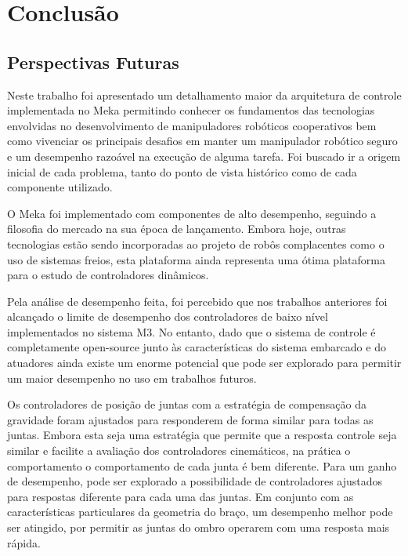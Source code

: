 \chapter{Conclusão} \label{ch:conclusoes}

\section{Perspectivas Futuras}

Neste trabalho foi apresentado um detalhamento maior da arquitetura de controle implementada no Meka permitindo conhecer os fundamentos das tecnologias envolvidas no desenvolvimento de manipuladores robóticos cooperativos bem como vivenciar os principais desafios em manter um manipulador robótico seguro e um desempenho razoável na execução de alguma tarefa. Foi buscado ir a origem inicial de cada problema, tanto do ponto de vista histórico como de cada componente utilizado.

O Meka foi implementado com componentes de alto desempenho, seguindo a filosofia do mercado na sua época de lançamento. Embora hoje, outras tecnologias estão sendo incorporadas ao projeto de robôs complacentes como o uso de sistemas freios, esta plataforma ainda representa uma ótima plataforma para o estudo de controladores dinâmicos.

Pela análise de desempenho feita, foi percebido que nos trabalhos anteriores foi alcançado o limite de desempenho dos controladores de baixo nível implementados no sistema M3. No entanto, dado que o sistema de controle é completamente open-source junto às características do sistema embarcado e do atuadores ainda existe um enorme potencial que pode ser explorado para permitir um maior desempenho no uso em trabalhos futuros.

Os controladores de posição de juntas com a estratégia de compensação da gravidade foram ajustados para responderem de forma similar para todas as juntas. Embora esta seja uma estratégia que permite que a resposta controle seja similar e facilite a avaliação dos controladores cinemáticos, na prática o comportamento o comportamento de cada junta é bem diferente. Para um ganho de desempenho, pode ser explorado a possibilidade de controladores ajustados para respostas diferente para cada uma das juntas. Em conjunto com as características particulares da geometria do braço, um desempenho melhor pode ser atingido, por permitir as juntas do ombro operarem com uma resposta mais rápida.

